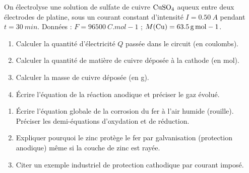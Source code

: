 \documentclass[11pt]{article}
\begin{document}
\begin{exercice}
On électrolyse une solution de sulfate de cuivre $\ce{CuSO4}$ aqueux entre deux électrodes de platine, sous un courant constant d'intensité $I = \SI{0,50}{A}$ pendant $t = \SI{30}{min}$.
Données : $F = \SI{96500}{C.mol-1}$ ; $M(\ce{Cu}) = \SI{63,5}{g.mol-1}$.
\begin{enumerate}
    \item Calculer la quantité d'électricité $Q$ passée dans le circuit (en coulombs).
    \item Calculer la quantité de matière de cuivre déposée à la cathode (en mol).
    \item Calculer la masse de cuivre déposée (en g).
    \item Écrire l'équation de la réaction anodique et préciser le gaz évolué.
\end{enumerate}
\end{exercice}

\begin{exercice}
\begin{enumerate}
    \item Écrire l'équation globale de la corrosion du fer à l'air humide (rouille). Préciser les demi-équations d'oxydation et de réduction.
    \item Expliquer pourquoi le zinc protège le fer par galvanisation (protection anodique) même si la couche de zinc est rayée.
    \item Citer un exemple industriel de protection cathodique par courant imposé.
\end{enumerate}
\end{exercice}
\end{document}
